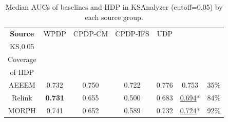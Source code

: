 \begin{table}[t]
\centering
\caption{Median AUCs of baselines and
HDP in KSAnalyzer (cutoff=0.05) by each source group.
}
\label{tab:compare}
\begin{tabular}{|@{ }c@{ }|@{ }c@{ }|@{ }c@{ }|@{ }c@{ }|@{ }c@{ }|@{ }c@{ }||@{ }c@{ }|}
\hline

{\bf Source}
& WPDP
& CPDP-CM
& CPDP-IFS
& UDP
& \specialcell{{HDP}\\{KS,0.05}}
& \specialcell{{Target}\\{Coverage}\\{of HDP}} \\ \hline \hline
AEEEM       &0.732  &0.750  &0.722  &0.776  &0.753    &35\%\\ \hline %
Relink      &{\bf 0.731}    &0.655  &0.500  &0.683  &\underline{0.694}*      &84\%\\ \hline %
MORPH       &0.741  &0.652  &0.589  &0.732  &\underline{0.724}*     &92\%\\ \hline	%

\end{tabular}
\end{table}
